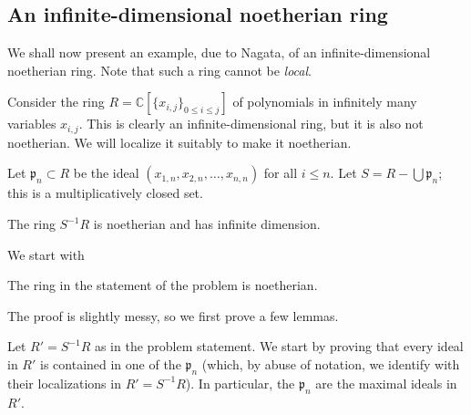 \subsection{An infinite-dimensional noetherian ring}

We shall now present an example, due to Nagata, of an infinite-dimensional
noetherian ring. Note that such a ring cannot be \emph{local}.

Consider the ring $R=\mathbb{C}[\{x_{i,j}\}_{0 \leq i \leq j}]$ of polynomials in 
infinitely many variables $x_{i,j}$. 
This is clearly an infinite-dimensional ring, but it is also not noetherian.
We will localize it suitably to make it noetherian.

Let $\mathfrak{p}_n \subset R$ be the
ideal  $(x_{1,n}, x_{2,n}, \dots, x_{n,n})$ for all $i \leq n$.
Let $S = R - \bigcup \mathfrak{p}_n$; this is a multiplicatively closed set. 

\begin{theorem}[Nagata] The ring $S^{-1}R$ is noetherian and has infinite
dimension.
\end{theorem} 

We start with
\begin{proposition} 
The ring in the statement of the problem is noetherian.
\end{proposition} 

The proof is slightly messy, so we first prove a few lemmas.

Let $R' = S^{-1}R$ as in the problem statement. We start by proving that every ideal in $R'$ is contained
in one of the $\mathfrak{p}_n$ (which, by abuse of notation, we identify with
their localizations in $R' = S^{-1}R$). 
In particular, the $\mathfrak{p}_n$ are the maximal ideals in $R'$.

